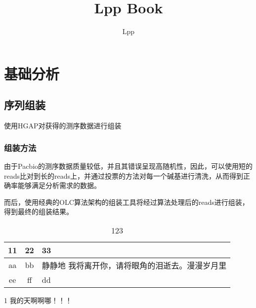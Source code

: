 \documentclass[UTF8,a4paper,sub3section]{ctexart}
\title{Lpp Book}
\author{Lpp}
\date{}
\let\stdsection\section
\renewcommand\section{\newpage\stdsection}
\begin{document}
\maketitle
\thispagestyle{empty}
\newpage

\pagestyle{plain}
\setcounter{page}{1}
\tableofcontents
\newpage

\setcounter{page}{1}
\pagestyle{fancy}

\section{基础分析}
\subsection{序列组装}
使用HGAP对获得的测序数据进行组装
\subsubsection{组装方法}
由于Pacbio的测序数据质量较低，并且其错误呈现高随机性，因此，可以使用短的reads比对到长的reads上，并通过投票的方法对每一个碱基进行清洗，从而得到正确率能够满足分析需求的数据\cite{HGAP}。


而后，使用经典的OLC算法架构的组装工具将经过算法处理后的reads进行组装，得到最终的组装结果。

%








\begin{table}[H]
    \caption{123}
        \begin{center}
            \begin{threeparttable}
                \begin{tabularx}{\textwidth}{cc|X}

                    \toprule
                    11&22&33\\
                    \midrule
                    aa&bb&静静地 \tnote{1} 我将离开你，请将眼角的泪逝去。漫漫岁月里\\

                    ee&ff&dd\\
                    \bottomrule

                \end{tabularx}
                \begin{tablenotes}

                    \footnotesize
                    \item[1] 我的天啊啊哪！！！
                \end{tablenotes}
            \end{threeparttable}
        \end{center}
\end{table}


\end{document}
